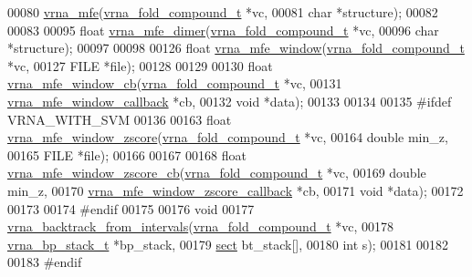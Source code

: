 \begin{DoxyCode}
00080 \mbox{\hyperlink{group__mfe__fold_gabd3b147371ccf25c577f88bbbaf159fd}{vrna\_mfe}}(\mbox{\hyperlink{group__fold__compound_structvrna__fc__s}{vrna\_fold\_compound\_t}} *vc,
00081          \textcolor{keywordtype}{char}                 *structure);
00082 
00083 
00095 \textcolor{keywordtype}{float} \mbox{\hyperlink{group__mfe__cofold_gaab22d10c1190f205f16a77cab9d5d3ee}{vrna\_mfe\_dimer}}(\mbox{\hyperlink{group__fold__compound_structvrna__fc__s}{vrna\_fold\_compound\_t}} *vc,
00096                      \textcolor{keywordtype}{char}                 *structure);
00097 
00098 
00126 \textcolor{keywordtype}{float} \mbox{\hyperlink{group__local__mfe__fold_ga689df235a1915a1ad56e377383c044ce}{vrna\_mfe\_window}}(\mbox{\hyperlink{group__fold__compound_structvrna__fc__s}{vrna\_fold\_compound\_t}}  *vc,
00127                       FILE                  *file);
00128 
00129 
00130 \textcolor{keywordtype}{float} \mbox{\hyperlink{mfe_8h_ad4995894b294ddb8550af444a0decbd1}{vrna\_mfe\_window\_cb}}(\mbox{\hyperlink{group__fold__compound_structvrna__fc__s}{vrna\_fold\_compound\_t}}     *vc,
00131                          \mbox{\hyperlink{group__mfe__fold_ga4f3e5bc214ef803074ace313cb9571b4}{vrna\_mfe\_window\_callback}} *cb,
00132                          \textcolor{keywordtype}{void}                     *data);
00133 
00134 
00135 \textcolor{preprocessor}{#ifdef VRNA\_WITH\_SVM}
00136 
00163 \textcolor{keywordtype}{float} \mbox{\hyperlink{group__local__mfe__fold_gaa4f67ae94efd08d800c17f9b53423fd6}{vrna\_mfe\_window\_zscore}}(\mbox{\hyperlink{group__fold__compound_structvrna__fc__s}{vrna\_fold\_compound\_t}} *vc,
00164                              \textcolor{keywordtype}{double}               min\_z,
00165                              FILE                 *file);
00166 
00167 
00168 \textcolor{keywordtype}{float} \mbox{\hyperlink{mfe_8h_a2762be816af3dbc18c256e44c1345e4f}{vrna\_mfe\_window\_zscore\_cb}}(\mbox{\hyperlink{group__fold__compound_structvrna__fc__s}{vrna\_fold\_compound\_t}}          
        *vc,
00169                                 \textcolor{keywordtype}{double}                          min\_z,
00170                                 \mbox{\hyperlink{mfe_8h_afeb8eb92805a0f0045dc20646ed0255b}{vrna\_mfe\_window\_zscore\_callback}} *cb,
00171                                 \textcolor{keywordtype}{void}                            *data);
00172 
00173 
00174 \textcolor{preprocessor}{#endif}
00175 
00176 \textcolor{keywordtype}{void}
00177 \mbox{\hyperlink{mfe_8h_a0c5119f7e130d7db9c0a46953cb068c4}{vrna\_backtrack\_from\_intervals}}(\mbox{\hyperlink{group__fold__compound_structvrna__fc__s}{vrna\_fold\_compound\_t}}  *vc,
00178                               \mbox{\hyperlink{group__data__structures_structvrna__bp__stack__s}{vrna\_bp\_stack\_t}}       *bp\_stack,
00179                               \mbox{\hyperlink{group__data__structures_structvrna__sect__s}{sect}}                  bt\_stack[],
00180                               \textcolor{keywordtype}{int}                   s);
00181 
00182 
00183 \textcolor{preprocessor}{#endif}
\end{DoxyCode}
